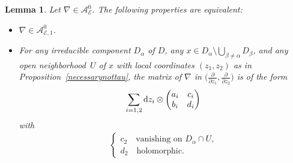 \documentclass[10pt,a4paper]{amsart}
\newcommand{\der}[2]{\frac{\partial #1}{\partial#2}}
\numberwithin{equation}{section}
\newtheorem{Lemma}[Theorem]{Lemma}
\begin{document}
\begin{Lemma}\label{caracterisationintermediate} Let $\nabla \in \mathcal{A}^0_\mathcal{E}$. The following properties are equivalent:
 \begin{itemize}\itemsep=0pt
 \item[$(i)$] $\nabla \in \mathcal{A}^0_{\mathcal{E},1}$.
 \item[$(ii)$] For any irreducible component $D_\alpha$ of $D$, any $x\in D_\alpha \setminus \bigcup_{\beta \neq \alpha} D_\beta$, and any open neighborhood~$U$ of $x$ with local coordinates $(z_1,z_2)$ as in Proposition~{\rm \ref{necessarynottau}}, the matrix of $\nabla$ in $\big(\der{}{z_1},\der{}{z_2}\big)$ is of the form
 \[\sum_{i=1,2}{\rm d}z_i \otimes \begin{pmatrix} a_i & c_i \\ b_i & d_i \end{pmatrix} \]
 with
 \begin{align*}%
 \begin{cases} c_2 \quad\text{vanishing on $D_\alpha\cap U$,} \\ d_2 \quad \text{holomorphic.} \end{cases}\end{align*}
 \end{itemize}

\end{Lemma}
\end{document}
